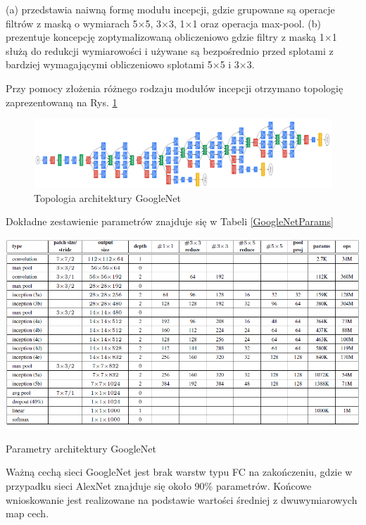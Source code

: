 (a) przedstawia naiwną formę modułu incepcji, gdzie grupowane są operacje filtrów z maską o wymiarach 5$\times$5, 3$\times$3, 1$\times$1 oraz operacja max-pool. (b) prezentuje koncepcję zoptymalizowaną obliczeniowo gdzie filtry z maską 1$\times$1 służą do redukcji wymiarowości i używane są bezpośrednio przed splotami z bardziej wymagającymi obliczeniowo splotami 5$\times$5 i 3$\times$3. 

Przy pomocy złożenia różnego rodzaju modułów incepcji otrzymano topologię zaprezentowaną na Rys. \ref{GoogleNetTopo}
\begin{figure}[h!]
	\centering
	\includegraphics[width=1\textwidth]{figures/GoogleNet.png}
	\caption{Topologia architektury GoogleNet}
	\label{GoogleNetTopo}
\end{figure}

Dokładne zestawienie parametrów znajduje się w Tabeli \ref{GoogleNetParams}

\begin{table}[h!]
	\centering
	\includegraphics[width=1\textwidth]{figures/GoogleNetparams.png}
	\caption{Parametry architektury GoogleNet}
	\label{GoogleNetParams}
\end{table}

Ważną cechą sieci GoogleNet jest brak warstw typu FC na zakończeniu, gdzie w przypadku sieci AlexNet znajduje się około 90\% parametrów. Końcowe wnioskowanie jest realizowane na podstawie wartości średniej z dwuwymiarowych map cech.

